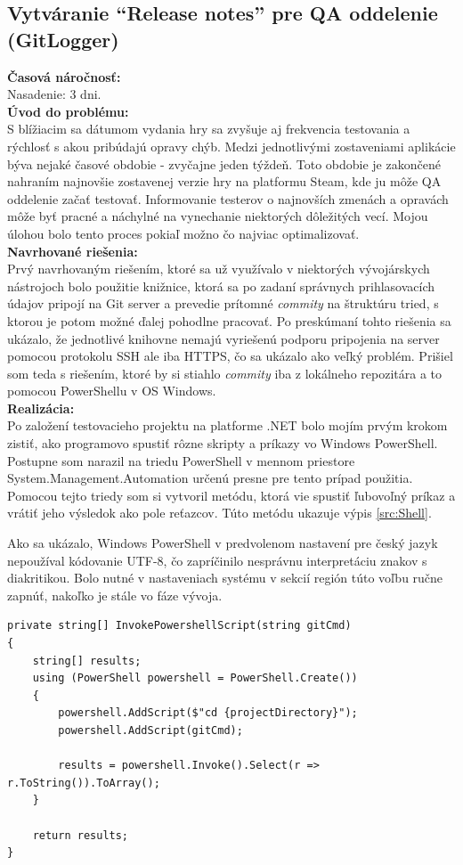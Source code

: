 \documentclass[slovak, bachelorpractice]{diploma}
\begin{document}
\subsection{Vytváranie \enquote{Release notes} pre QA oddelenie (GitLogger)}
\label{sec:GitLogger}
\textbf{Časová náročnosť:} \\ Nasadenie: 3 dni.\\
\textbf{Úvod do problému:} \\ S blížiacim sa dátumom vydania hry sa zvyšuje aj frekvencia testovania a rýchlosť s akou pribúdajú opravy chýb. Medzi jednotlivými zostaveniami aplikácie býva nejaké časové obdobie - zvyčajne jeden týždeň. Toto obdobie je zakončené nahraním najnovšie zostavenej verzie hry na platformu Steam, kde ju môže QA oddelenie začať testovať. Informovanie testerov o najnovších zmenách a opravách môže byť pracné a náchylné na vynechanie niektorých dôležitých vecí. Mojou úlohou bolo tento proces pokiaľ možno čo najviac optimalizovať.\\
\textbf{Navrhované riešenia:} \\ Prvý navrhovaným riešením, ktoré sa už využívalo v niektorých vývojárskych nástrojoch bolo použitie knižnice, ktorá sa po zadaní správnych prihlasovacích údajov pripojí na Git server a prevedie prítomné \textit{commity} na štruktúru tried, s ktorou je potom možné ďalej pohodlne pracovať. Po preskúmaní tohto riešenia sa ukázalo, že jednotlivé knihovne nemajú vyriešenú podporu pripojenia na server pomocou protokolu SSH ale iba HTTPS, čo sa ukázalo ako veľký problém. Prišiel som teda s riešením, ktoré by si stiahlo \textit{commity} iba z lokálneho repozitára a to pomocou PowerShellu v OS Windows.  \\
\textbf{Realizácia:} \\ Po založení testovacieho projektu na platforme .NET bolo mojím prvým krokom zistiť, ako programovo spustiť rôzne skripty a príkazy vo Windows PowerShell. Postupne som narazil na triedu PowerShell v mennom priestore System.Management.Automation určenú presne pre tento prípad použitia. Pomocou tejto triedy som si vytvoril metódu, ktorá vie spustiť ľubovoľný príkaz a vrátiť jeho výsledok ako pole reťazcov. Túto metódu ukazuje výpis \ref{src:Shell}. 

Ako sa ukázalo, Windows PowerShell v predvolenom nastavení pre český jazyk nepoužíval kódovanie UTF-8, čo zapríčinilo nesprávnu interpretáciu znakov s diakritikou. Bolo nutné v nastaveniach systému v sekcií región túto voľbu ručne zapnúť, nakoľko je stále vo fáze vývoja.
\vspace{10pt}
\begin{lstlisting}[label=src:Shell,caption={Metóda InvokePowershellScript triedy GitLogger}]
private string[] InvokePowershellScript(string gitCmd)
{
    string[] results;
    using (PowerShell powershell = PowerShell.Create())
    {
        powershell.AddScript($"cd {projectDirectory}");
        powershell.AddScript(gitCmd);

        results = powershell.Invoke().Select(r => r.ToString()).ToArray();
    }

    return results;
}
\end{lstlisting}
\end{document}
